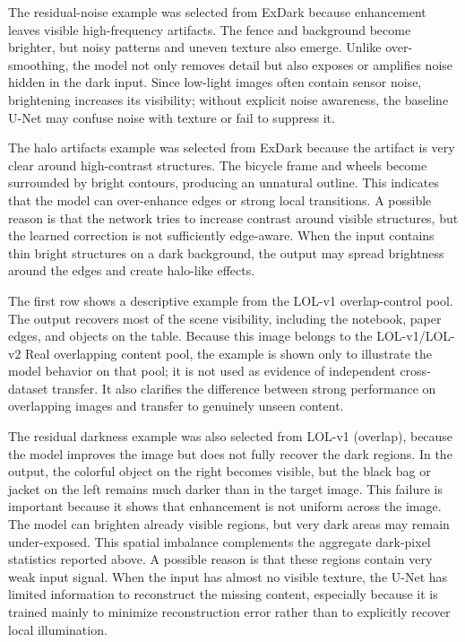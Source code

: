 The residual-noise example was selected from ExDark because enhancement leaves visible high-frequency artifacts. The fence and background become brighter, but noisy patterns and uneven texture also emerge. Unlike over-smoothing, the model not only removes detail but also exposes or amplifies noise hidden in the dark input. Since low-light images often contain sensor noise, brightening increases its visibility; without explicit noise awareness, the baseline U-Net may confuse noise with texture or fail to suppress it.

The halo artifacts example was selected from ExDark because the artifact is very clear around high-contrast structures. The bicycle frame and wheels become surrounded by bright contours, producing an unnatural outline. This indicates that the model can over-enhance edges or strong local transitions. A possible reason is that the network tries to increase contrast around visible structures, but the learned correction is not sufficiently edge-aware. When the input contains thin bright structures on a dark background, the output may spread brightness around the edges and create halo-like effects.

The first row shows a descriptive example from the LOL-v1 overlap-control pool. The output recovers most of the scene visibility, including the notebook, paper edges, and objects on the table. Because this image belongs to the LOL-v1/LOL-v2 Real overlapping content pool, the example is shown only to illustrate the model behavior on that pool; it is not used as evidence of independent cross-dataset transfer. It also clarifies the difference between strong performance on overlapping images and transfer to genuinely unseen content.

The residual darkness example was also selected from LOL-v1 (overlap), because the model improves the image but does not fully recover the dark regions. In the output, the colorful object on the right becomes visible, but the black bag or jacket on the left remains much darker than in the target image. This failure is important because it shows that enhancement is not uniform across the image. The model can brighten already visible regions, but very dark areas may remain under-exposed. This spatial imbalance complements the aggregate dark-pixel statistics reported above. A possible reason is that these regions contain very weak input signal. When the input has almost no visible texture, the U-Net has limited information to reconstruct the missing content, especially because it is trained mainly to minimize reconstruction error rather than to explicitly recover local illumination.

